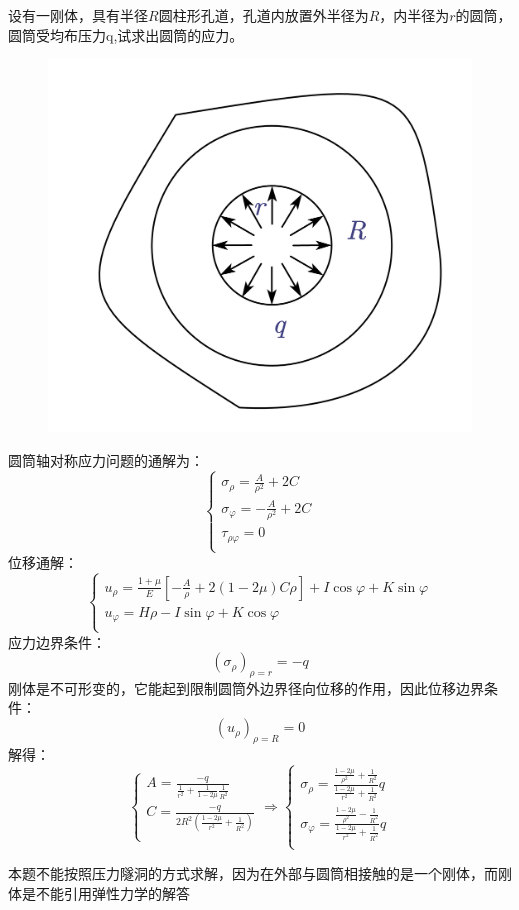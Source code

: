\begin{example}
设有一刚体，具有半径$R$圆柱形孔道，孔道内放置外半径为$R$，内半径为$r$的圆筒，圆筒受均布压力q,试求出圆筒的应力。
\end{example}
\begin{figure}[!h]
	\centering
	\includegraphics[scale=0.5]{figure/4-8.png}
\end{figure}
	\begin{remark}
		圆筒轴对称应力问题的通解为：
		\[\begin{cases}
		\sigma _{\rho}=\frac{A}{\rho ^2}+2C\\
		\sigma _{\varphi}=-\frac{A}{\rho ^2}+2C\\
		\tau _{\rho \varphi}=0\\
		\end{cases}\]
		位移通解：\[\begin{cases}
		u_{\rho}=\frac{1+\mu}{E}\left[ -\frac{A}{\rho}+2\left( 1-2\mu \right) C\rho \right] +I\cos \varphi +K\sin \varphi\\
		u_{\varphi}=H\rho -I\sin \varphi +K\cos \varphi\\
		\end{cases}\]
		应力边界条件：\[\left( \sigma _{\rho} \right) _{\rho =r}=-q\]
		刚体是不可形变的，它能起到限制圆筒外边界径向位移的作用，因此位移边界条件：\[\left( u_{\rho} \right) _{\rho =R}=0\]
		解得：\[\begin{cases}
		A=\frac{-q}{\frac{1}{r^2}+\frac{1}{1-2\mu}\frac{1}{R^2}}\\
		C=\frac{-q}{2R^2\left( \frac{1-2\mu}{r^2}+\frac{1}{R^2} \right)}\\
		\end{cases}\Longrightarrow \begin{cases}
		\sigma _{\rho}=\frac{\frac{1-2\mu}{\rho ^2}+\frac{1}{R^2}}{\frac{1-2\mu}{r^2}+\frac{1}{R^2}}q\\
		\sigma _{\varphi}=\frac{\frac{1-2\mu}{\rho ^2}-\frac{1}{R^2}}{\frac{1-2\mu}{r^2}+\frac{1}{R^2}}q\\
		\end{cases}\]
	\end{remark}
	\begin{note}
		本题不能按照压力隧洞的方式求解，因为在外部与圆筒相接触的是一个刚体，而刚体是不能引用弹性力学的解答
	\end{note}
